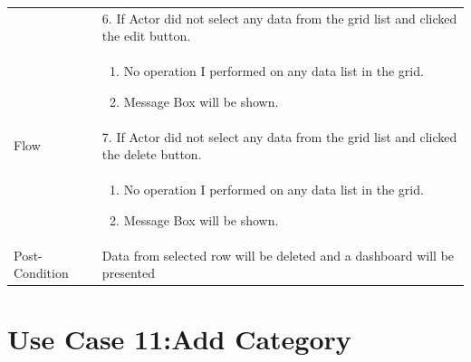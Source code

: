 \documentclass[12pt,a4paper]{report}
\begin{document}
\begin{tabular}{ | m{3cm} | m{12cm}| } \hline 
& 6. If Actor did not select any data from the grid list and clicked the edit button.\\
& \begin{enumerate}
		\item No operation I performed on any data list in the grid.
            \item Message Box will be shown.
	\end{enumerate}
\\
Flow       & 7. If Actor did not select any data from the grid list and clicked the delete button.\\
 	&\begin{enumerate}
			\item No operation I performed on any data list in the grid.
            \item Message Box will be shown.
	\end{enumerate}
\\ \hline 


Post-Condition &  Data from selected row will be deleted and a dashboard will be presented  \\ \hline

\end{tabular}




\section{Use Case 11:Add Category}
\end{document}
